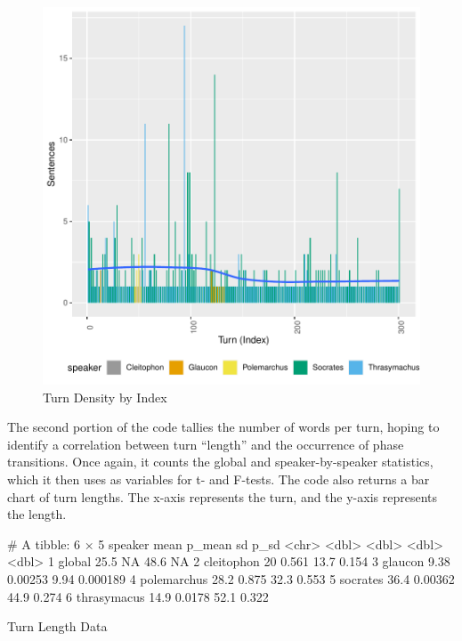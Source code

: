 \documentclass[noraggedright]{turabian-researchpaper}
\begin{document}
\begin{figure}[htbp]
\includegraphics{GreatFlood-Figure: Turn Conseq}
\caption{Turn Density by Index}
\label{fig:DensityPlot}
\end{figure}

The second portion of the code tallies the number of words per turn, hoping to identify a correlation between turn ``length'' and the occurrence of phase transitions. Once again, it counts the global and speaker-by-speaker statistics, which it then uses as variables for t- and F-tests. The code also returns a bar chart of turn lengths. The x-axis represents the turn, and the y-axis represents the length.

\begin{table}[hbtp]
\begin{Schunk}
\begin{Soutput}
# A tibble: 6 × 5
  speaker      mean   p_mean    sd      p_sd
  <chr>       <dbl>    <dbl> <dbl>     <dbl>
1 global      25.5  NA       48.6  NA       
2 cleitophon  20     0.561   13.7   0.154   
3 glaucon      9.38  0.00253  9.94  0.000189
4 polemarchus 28.2   0.875   32.3   0.553   
5 socrates    36.4   0.00362 44.9   0.274   
6 thrasymacus 14.9   0.0178  52.1   0.322   
\end{Soutput}
\end{Schunk}
\caption{Turn Length Data}
\label{tab:LengthData}
\end{table}
\end{document}
